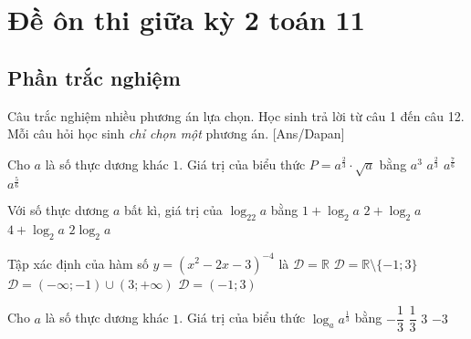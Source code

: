 \section{Đề ôn thi giữa kỳ 2 toán 11}
\subsection{Phần trắc nghiệm}
Câu trắc nghiệm nhiều phương án lựa chọn. Học sinh trả lời từ
câu 1 đến câu 12. Mỗi câu hỏi học sinh \textit{chỉ chọn một} phương án.
[Ans/Dapan]

\hienthiloigiaiex
\begin{ex}%
	Cho $a$ là số thực dương khác $1$. Giá trị của biểu thức $P=a^{\tfrac{2}{3}}\cdot\sqrt{a}$ bằng
	\choice
	{$a^3$}
	{$a^{\tfrac{2}{3}}$}
	{\True $a^{\tfrac{7}{6}}$}
	{$a^{\tfrac{5}{6}}$}
\end{ex}
\begin{ex}%
	Với số thực dương $a$ bất kì, giá trị của $\log_22a$ bằng
	\choice
	{\True $1+\log_2a$}
	{$2+\log_2a$}
	{$4+\log_2a$}
	{$2\log_2a$}
\end{ex}
\begin{ex}%
	Tập xác định của hàm số $y=(x^2-2x-3)^{-4}$ là
	\choice
	{$\mathscr{D}=\mathbb{R}$}
	{\True $\mathscr{D}=\mathbb{R}\setminus\{-1;3\}$}
	{$\mathscr{D}=(-\infty;-1)\cup(3;+\infty)$}
	{$\mathscr{D}=(-1;3)$}
\end{ex}
\begin{ex}%
	Cho $a$ là số thực dương khác $1$. Giá trị của biểu thức $\log_a a^{\tfrac{1}{3}}$ bằng
	\choice
	{$-\dfrac{1}{3}$}
	{\True $\dfrac{1}{3}$}
	{$3$}
	{$-3$}
\end{ex}
